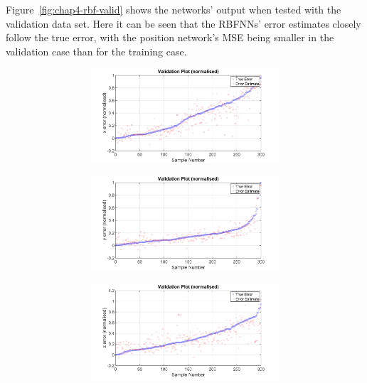 Figure~\ref{fig:chap4-rbf-valid} shows the networks' output when tested with the validation data set. Here it can be seen that the RBFNNs' error estimates closely follow the true error, with the position network's MSE being smaller in the validation case than for the training case. 

\begin{figure}
  \begin{subfigure}{0.48\textwidth}
    \begin{subfigure}{\textwidth}
      \includegraphics[clip, trim = 80 0 100 0, width=\textwidth]{figures/chapter4/v_x}
    \end{subfigure}
    \begin{subfigure}{\textwidth}
      \includegraphics[clip, trim = 80 0 100 0, width=\textwidth]{figures/chapter4/v_y}
    \end{subfigure}
    \begin{subfigure}{\textwidth}
      \includegraphics[clip, trim = 80 0 100 0, width=\textwidth]{figures/chapter4/v_z}

\end{subfigure}
\end{subfigure}
\end{figure}
